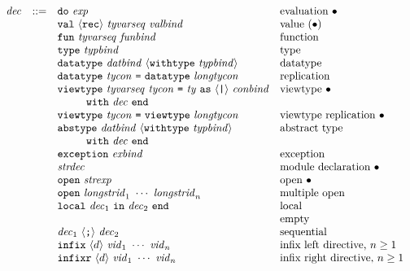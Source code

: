 \documentclass[twoside,titlepage]{article}
\begin{document}
\begin{appendix}
  $$
  \begin{array}{llll}
  \mathit{dec} & ::= & {\tt{do}}~\mathit{exp} & \textrm{evaluation $\bullet$} \\
  && {\tt{val}}~\langle{\tt{rec}}\rangle~\mathit{tyvarseq}~\mathit{valbind} & \textrm{value $(\bullet)$} \\
  && {\tt{fun}}~\mathit{tyvarseq}~\mathit{funbind} & \textrm{function} \\
  && {\tt{type}}~\mathit{typbind} & \textrm{type} \\
  && {\tt{datatype}}~\mathit{datbind}~\langle{\tt{withtype}}~\mathit{typbind}\rangle & \textrm{datatype} \\
  && {\tt{datatype}}~\mathit{tycon}~\mbox{\tt=}~{\tt{datatype}}~\mathit{longtycon} & \textrm{replication} \\
  && {\tt{viewtype}}~\mathit{tyvarseq}~\mathit{tycon}~\mbox{\tt=}~\mathit{ty}~{\tt{as}}~\langle\mbox{\tt|}\rangle~\mathit{conbind} & \textrm{viewtype $\bullet$} \\
  && ~~~~~~~~{\tt{with}}~\mathit{dec}~{\tt{end}} \\
  && {\tt{viewtype}}~\mathit{tycon}~\mbox{\tt=}~{\tt{viewtype}}~\mathit{longtycon} & \textrm{viewtype replication $\bullet$} \\
  && {\tt{abstype}}~\mathit{datbind}~\langle{\tt{withtype}}~\mathit{typbind}\rangle & \textrm{abstract type} \\
  && ~~~~~~~~{\tt{with}}~\mathit{dec}~{\tt{end}} \\
  && {\tt{exception}}~\mathit{exbind} & \textrm{exception} \\
  && \mathit{strdec} & \textrm{module declaration $\bullet$} \\
  && {\tt{open}}~\mathit{strexp} & \textrm{open $\bullet$} \\
  && {\tt{open}}~\mathit{longstrid}_1~\cdots~\mathit{longstrid}_n & \textrm{multiple open} \\
  && {\tt{local}}~\mathit{dec}_1~{\tt{in}}~\mathit{dec}_2~{\tt{end}} & \textrm{local} \\
  &&  & \textrm{empty} \\
  && \mathit{dec}_1~\langle\mbox{\tt;}\rangle~\mathit{dec}_2 & \textrm{sequential} \\
  && {\tt{infix}}~\langle d\rangle~\mathit{vid}_1~\cdots~\mathit{vid}_n & \textrm{infix left directive, $n\geq1$} \\
  && {\tt{infixr}}~\langle d\rangle~\mathit{vid}_1~\cdots~\mathit{vid}_n & \textrm{infix right directive, $n\geq1$} \\

\end{array}$$
\end{appendix}
\end{document}
